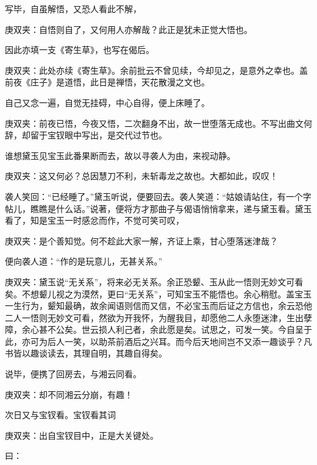 \begin{parag}
    写毕，自虽解悟，又恐人看此不解，\begin{note}庚双夹：自悟则自了，又何用人亦解哉？此正是犹未正觉大悟也。\end{note}因此亦填一支《寄生草》，也写在偈后。\begin{note}庚双夹：此处亦续《寄生草》。余前批云不曾见续，今却见之，是意外之幸也。盖前夜《庄子》是道悟，此日是禅悟，天花散漫之文也。\end{note}自己又念一遍，自觉无挂碍，中心自得，便上床睡了。\begin{note}庚双夹：前夜已悟，今夜又悟，二次翻身不出，故一世堕落无成也。不写出曲文何辞，却留于宝钗眼中写出，是交代过节也。\end{note}
\end{parag}


\begin{parag}
    谁想黛玉见宝玉此番果断而去，故以寻袭人为由，来视动静。\begin{note}庚双夹：这又何必？总因慧刀不利，未斩毒龙之故也。大都如此，叹叹！\end{note}袭人笑回：“已经睡了。”黛玉听说，便要回去。袭人笑道：“姑娘请站住，有一个字帖儿，瞧瞧是什么话。”说著，便将方才那曲子与偈语悄悄拿来，递与黛玉看。黛玉看了，知是宝玉一时感忿而作，不觉可笑可叹，\begin{note}庚双夹：是个善知觉。何不趁此大家一解，齐证上乘，甘心堕落迷津哉？\end{note}便向袭人道：“作的是玩意儿，无甚关系。”\begin{note}庚双夹：黛玉说“无关系”，将来必无关系。余正恐颦、玉从此一悟则无妙文可看矣。不想颦儿视之为漠然，更曰“无关系”，可知宝玉不能悟也。余心稍慰。盖宝玉一生行为，颦知最确，故余闻语则信而又信，不必宝玉而后证之方信也，余云恐他二人一悟则无妙文可看，然欲为开我怀，为醒我目，却愿他二人永堕迷津，生出孽障，余心甚不公矣。世云损人利己者，余此愿是矣。试思之，可发一笑。今自呈于此，亦可为后人一笑，以助茶前酒后之兴耳。而今后天地间岂不又添一趣谈乎？凡书皆以趣谈读去，其理自明，其趣自得矣。\end{note}说毕，便携了回房去，与湘云同看。\begin{note}庚双夹：却不同湘云分崩，有趣！\end{note}次日又与宝钗看。宝钗看其词\begin{note}庚双夹：出自宝钗目中，正是大关键处。\end{note}曰：
\end{parag}


